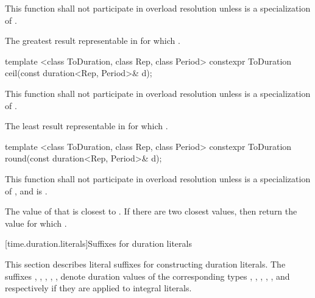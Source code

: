 \begin{itemdescr}
\pnum
\remarks This function shall not participate in overload resolution
unless  is a specialization of .

\pnum
\returns The greatest result  representable in 
for which .
\end{itemdescr}

%
%
\begin{itemdecl}
template <class ToDuration, class Rep, class Period>
  constexpr ToDuration ceil(const duration<Rep, Period>& d);
\end{itemdecl}

\begin{itemdescr}
\pnum
\remarks This function shall not participate in overload resolution
unless  is a specialization of .

\pnum
\returns The least result  representable in 
for which .
\end{itemdescr}

%
%
\begin{itemdecl}
template <class ToDuration, class Rep, class Period>
  constexpr ToDuration round(const duration<Rep, Period>& d);
\end{itemdecl}

\begin{itemdescr}
\pnum
\remarks This function shall not participate in overload resolution
unless  is a specialization of ,
and 
is .

\pnum
\returns The value of  that is closest to .
If there are two closest values, then return the value 
for which .
\end{itemdescr}

[time.duration.literals]{Suffixes for duration literals}

\pnum
This section describes literal suffixes for constructing duration literals. The
suffixes , , , , , 
denote duration values of the corresponding types , ,
, , , and 
respectively if they are applied to integral literals.

